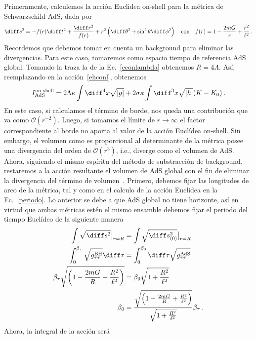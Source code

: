 \documentclass[../Main.tex]{subfiles}
\begin{document}
Primeramente, calculemos la acción Euclidea on-shell para la métrica de Schwarzschild-AdS, dada por
\begin{align}
    \diff s^2=-f(r)\diff t^2+\frac{\diff r^2}{f(r)}+r^2\left(\diff \theta^2+\sin^2\theta\diff \phi^2\right)\,\,\,\,\,\,\mbox{con}\,\,\,\,\,\, f(r)=1-\frac{2mG}{r}+\frac{r^2}{\ell^2}\, .
\end{align} \label{schwads}
Recordemos que debemos tomar en cuenta un background para eliminar las divergencias. Para este caso, tomaremos como espacio tiempo de referencia AdS global. Tomando la traza la de la Ec.~\eqref{econlambda} obtenemos $R=4\Lambda$. Así, reemplazando en la acción~\eqref{ehconl}, obtenemos 
\begin{align}
I^{\text{on-shell}}_{\text{AdS}}=2\Lambda\kappa\int \diff^{4}x \sqrt{|g|}+2\sigma\kappa\int \diff^{3}x \sqrt{|h|}(K-K_{0}) \, .
\end{align}
En este caso, si calculamos el término de borde, nos queda una contribución que va como $\mathcal{O}(r^{-2})$. Luego, si tomamos el límite de $r\to\infty$ el factor correspondiente al borde no aporta al valor de la acción Euclídea on-shell. Sin embargo, el volumen como es proporcional al determinante de la métrica posee una divergencia del orden de $\mathcal{O}(r^{3})$, i.e., diverge como el volumen de AdS. 
Ahora, siguiendo el mismo espíritu del método de substracción de background, restaremos a la acción resultante el volumen de AdS global con el fin de eliminar la divergencia del término de volumen~\cite{Hawking:1982dh}. Primero, debemos fijar las longitudes de arco de la métrica, tal y como en el calculo de la acción Euclídea en la Ec.~\eqref{periodo}. Lo anterior se debe a que AdS global no tiene horizonte, así en virtud que ambas métricas estén el mismo ensamble debemos fijar el periodo del tiempo Euclídeo de la siguiente manera
\begin{align}\notag
\int \sqrt{\diff s^2}\big|_{r=R}&=\int \sqrt{\diff s^2_{(0)}}\big|_{r=R}\\ \notag
\int_{0}^{\beta_\tau}\sqrt{g^{\rm BH}_{\tau\tau}}\diff\tau&=\int_{0}^{\beta_0}\diff\tau\sqrt{g^{\rm AdS}_{\tau\tau}}\\ \notag
\beta_\tau\sqrt{\left(1-\frac{2mG}{R}+\frac{R^2}{\ell^2}\right)}&=\beta_0\sqrt{1+\frac{R^2}{\ell^2}}\\
\beta_0&=\frac{\sqrt{\left(1-\frac{2mG}{R}+\frac{R^2}{\ell^2}\right)}}{\sqrt{1+\frac{R^2}{\ell^2}}}\beta_{\tau} \, .
\end{align}
Ahora, la integral de la acción será
\end{document}
